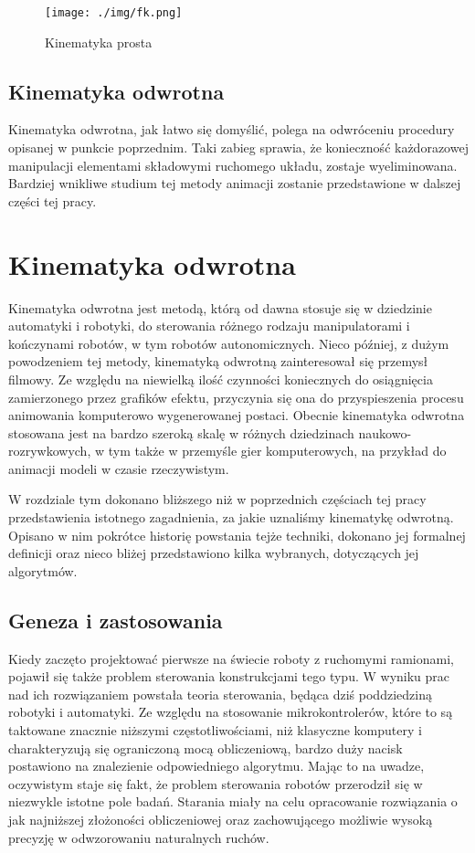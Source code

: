 \documentclass[11pt]{mwrep}
\begin{document}
  \begin{figure}
  \centering
    \texttt{[image: ./img/fk.png]}
  \caption{Kinematyka prosta}
  \label{img:fk}
  \end{figure}

  \section{Kinematyka odwrotna}

  Kinematyka odwrotna, jak łatwo się domyślić, polega na odwróceniu procedury opisanej w punkcie poprzednim. Taki zabieg sprawia, że konieczność każdorazowej manipulacji elementami składowymi ruchomego układu, zostaje wyeliminowana. Bardziej wnikliwe studium tej metody animacji zostanie przedstawione w dalszej części tej pracy.


  
\chapter{Kinematyka odwrotna}

Kinematyka odwrotna jest metodą, którą od dawna stosuje się w dziedzinie automatyki i robotyki, do sterowania różnego rodzaju manipulatorami i kończynami robotów, w tym robotów autonomicznych. Nieco później, z dużym powodzeniem tej metody, kinematyką odwrotną zainteresował się przemysł filmowy. Ze względu na niewielką ilość czynności koniecznych do osiągnięcia zamierzonego przez grafików efektu, przyczynia się ona do przyspieszenia procesu animowania komputerowo wygenerowanej postaci. Obecnie kinematyka odwrotna stosowana jest na bardzo szeroką skalę w różnych dziedzinach naukowo-rozrywkowych, w tym także w przemyśle gier komputerowych, na przykład do animacji modeli w czasie rzeczywistym.

W rozdziale tym dokonano bliższego niż w poprzednich częściach tej pracy przedstawienia istotnego zagadnienia, za jakie uznaliśmy kinematykę odwrotną. Opisano w nim pokrótce historię powstania tejże techniki, dokonano jej formalnej definicji oraz nieco bliżej przedstawiono kilka wybranych, dotyczących jej algorytmów.

  \section{Geneza i zastosowania}

  Kiedy zaczęto projektować pierwsze na świecie roboty z ruchomymi ramionami, pojawił się także problem sterowania konstrukcjami tego typu. W wyniku prac nad ich rozwiązaniem powstała teoria sterowania, będąca dziś poddziedziną robotyki i automatyki. Ze względu na stosowanie mikrokontrolerów, które to są taktowane znacznie niższymi częstotliwościami, niż klasyczne komputery i charakteryzują się ograniczoną mocą obliczeniową, bardzo duży nacisk postawiono na znalezienie odpowiedniego algorytmu. Mając to na uwadze, oczywistym staje się fakt, że problem sterowania robotów przerodził się w niezwykle istotne pole badań. Starania miały na celu opracowanie rozwiązania o jak najniższej złożoności obliczeniowej oraz zachowującego możliwie wysoką precyzję w odwzorowaniu naturalnych ruchów.
\end{document}
